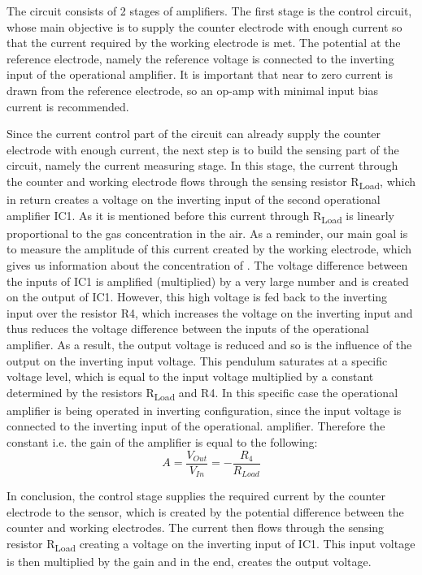 The circuit consists of 2 stages of amplifiers. The first stage is the control circuit, whose main objective is to supply the counter electrode with enough current so that the current required by the working electrode is met. The potential at the reference electrode, namely the reference voltage is connected to the inverting input of the operational amplifier. It is important that near to zero current is drawn from the reference electrode, so an op-amp with minimal input bias current is recommended. \cite{2009} \par 
Since the current control part of the circuit can already supply the counter electrode with enough current, the next step is to build the sensing part of the circuit, namely the current measuring stage. In this stage, the current through the counter and working electrode flows through the sensing resistor R\textsubscript{Load}, which in return creates a voltage on the inverting input of the second operational amplifier IC1. As it is mentioned before this current through R\textsubscript{Load} is linearly proportional to the gas concentration in the air. As a reminder, our main goal is to measure the amplitude of this current created by the working electrode, which gives us information about the concentration of . The voltage difference between the inputs of IC1 is amplified (multiplied) by a very large number and is created on the output of IC1. However, this high voltage is fed back to the inverting input over the resistor R4, which increases the voltage on the inverting input and thus reduces the voltage difference between the inputs of the operational amplifier. As a result, the output voltage is reduced and so is the influence of the output on the inverting input voltage. This pendulum saturates at a specific voltage level, which is equal to the input voltage multiplied by a constant determined by the resistors R\textsubscript{Load} and R4. In this specific case the operational amplifier is being operated in inverting configuration, since the input voltage is connected to the inverting input of the operational. amplifier. Therefore the constant i.e. the gain of the amplifier is equal to the following: \[A = \frac{V_{Out}}{V_{In}} = -\frac{R_4}{R_{Load}} \] \par
In conclusion, the control stage supplies the required current by the counter electrode to the sensor, which is created by the potential difference between the counter and working electrodes. The current then flows through the sensing resistor  R\textsubscript{Load} creating a voltage on the inverting input of IC1. This input voltage is then multiplied by the gain and in the end, creates the output voltage.

